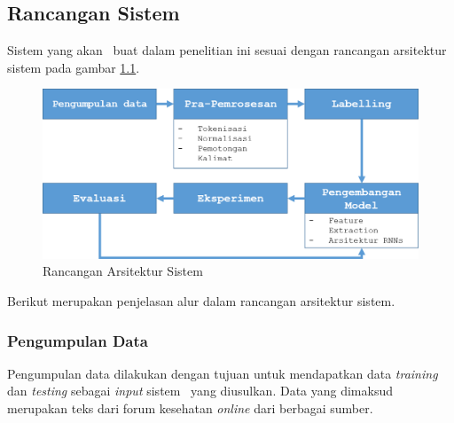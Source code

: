 \chapter{\babTiga}
\section{Rancangan Sistem}
Sistem yang akan \saya~buat dalam penelitian ini sesuai dengan rancangan arsitektur sistem pada gambar \ref{fig:arsitektur_sistem}.
\begin{figure}
  \centering
  \includegraphics[width=\linewidth]{images/arsitektur}
  \caption{Rancangan Arsitektur Sistem}
  \label{fig:arsitektur_sistem}
\end{figure}

Berikut merupakan penjelasan alur dalam rancangan arsitektur sistem.
	\subsection{Pengumpulan Data}
	Pengumpulan data dilakukan dengan tujuan untuk mendapatkan data \textit{training} dan \textit{testing} sebagai \textit{input} sistem \mer~yang diusulkan. Data yang dimaksud merupakan teks dari forum kesehatan \textit{online} dari berbagai sumber. 
	
